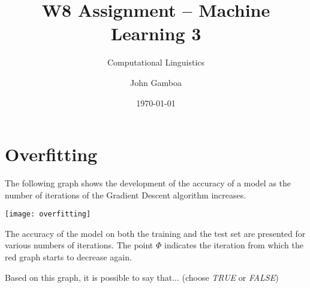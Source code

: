 \documentclass[a4paper,11pt]{scrartcl}
\title{W8 Assignment -- Machine Learning 3}
\subtitle{Computational Linguistics}
\author{John Gamboa}
\date{\today}
\begin{document}
\maketitle

\section{Overfitting}

The following graph shows the development of the accuracy of a model as the
number of iterations of the Gradient Descent algorithm increases.

\texttt{[image: overfitting]}


The accuracy of the model on both the training and the test set are presented
for various numbers of iterations. The point $\Phi$ indicates the iteration
from which the red graph starts to decrease again.

Based on this graph, it is possible to say that...
(choose \textit{TRUE} or \textit{FALSE})
\end{document}
